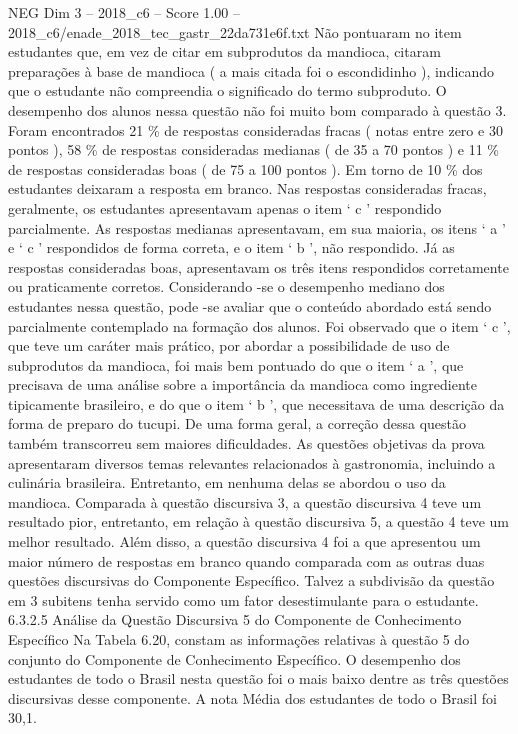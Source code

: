\begin{textsample}{NEG Dim 3 – 2018\_c6 – Score 1.00 – 2018\_c6/enade\_2018\_tec\_gastr\_22da731e6f.txt}
Não pontuaram no item estudantes que, em vez de citar em subprodutos da mandioca, citaram preparações à base de mandioca ( a mais citada foi o escondidinho ), indicando que o estudante não compreendia o significado do termo subproduto.
O desempenho dos alunos nessa questão não foi muito bom comparado à questão 3.
Foram encontrados 21 \% de respostas consideradas fracas ( notas entre zero e 30 pontos ), 58 \% de respostas consideradas medianas ( de 35 a 70 pontos ) e 11 \% de respostas consideradas boas ( de 75 a 100 pontos ).
Em torno de 10 \% dos estudantes deixaram a resposta em branco.
Nas respostas consideradas fracas, geralmente, os estudantes apresentavam apenas o item ‘ c ’ respondido parcialmente.
As respostas medianas apresentavam, em sua maioria, os itens ‘ a ’ e ‘ c ’ respondidos de forma correta, e o item ‘ b ’, não respondido.
Já as respostas consideradas boas, apresentavam os três itens respondidos corretamente ou praticamente corretos.
Considerando -se o desempenho mediano dos estudantes nessa questão, pode -se avaliar que o conteúdo abordado está sendo parcialmente contemplado na formação dos alunos.
Foi observado que o item ‘ c ’, que teve um caráter mais prático, por abordar a possibilidade de uso de subprodutos da mandioca, foi mais bem pontuado do que o item ‘ a ’, que precisava de uma análise sobre a importância da mandioca como ingrediente tipicamente brasileiro, e do que o item ‘ b ’, que necessitava de uma descrição da forma de preparo do tucupi.
De uma forma geral, a correção dessa questão também transcorreu sem maiores dificuldades.
As questões objetivas da prova apresentaram diversos temas relevantes relacionados à gastronomia, incluindo a culinária brasileira.
Entretanto, em nenhuma delas se abordou o uso da mandioca.
Comparada à questão discursiva 3, a questão discursiva 4 teve um resultado pior, entretanto, em relação à questão discursiva 5, a questão 4 teve um melhor resultado.
Além disso, a questão discursiva 4 foi a que apresentou um maior número de respostas em branco quando comparada com as outras duas questões discursivas do Componente Específico.
Talvez a subdivisão da questão em 3 subitens tenha servido como um fator desestimulante para o estudante. 6.3.2.5 Análise da Questão Discursiva 5 do Componente de Conhecimento Específico Na Tabela 6.20, constam as informações relativas à questão 5 do conjunto do Componente de Conhecimento Específico.
O desempenho dos estudantes de todo o Brasil nesta questão foi o mais baixo dentre as três questões discursivas desse componente.
A nota Média dos estudantes de todo o Brasil foi 30,1.

\end{textsample}

